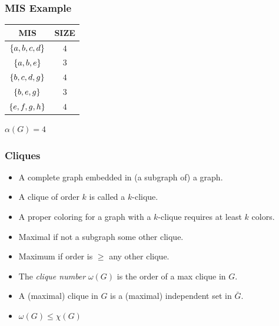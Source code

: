 \documentclass{beamer}
\renewcommand{\a}{\alpha}
\newcommand{\w}{\omega}
\newcommand{\X}{\chi}
\DeclarePairedDelimiter{\set}{\{}{\}}
\begin{document}
\begin{frame}
  \frametitle{MIS Example}
  \begin{center}
    \begin{minipage}{2in}
      \centering
    \end{minipage}
    \begin{minipage}{2in}
      \centering
      \begin{tabular}{c|c}
        MIS & SIZE \\
        \hline
        \(\set{a, b, c, d}\) & \(4\) \\
        \(\set{a, b, e}\) & \(3\) \\
        \(\set{b, c, d, g}\) & \(4\) \\
        \(\set{b, e, g}\) & \(3\) \\
        \(\set{e, f, g, h}\) & \(4\)
      \end{tabular}

      \bigskip

      \(\a(G)=4\)
    \end{minipage}
  \end{center}
\end{frame}

\begin{frame}
  \frametitle{Cliques}
  \begin{itemize}
  \item A complete graph embedded in (a subgraph of) a graph.
  \item A clique of order \(k\) is called a \(k\)-clique.
  \item A proper coloring for a graph with a \(k\)-clique requires at least \(k\) colors.
  \item Maximal if not a subgraph some other clique.
  \item Maximum if order is \(\ge\) any other clique.
  \item The \emph{clique number} \(\w(G)\) is the order of a max clique in \(G\).
  \item A (maximal) clique in \(G\) is a (maximal) independent set in \(\bar{G}\).
  \item \(\w(G)\le\X(G)\)
  \end{itemize}
\end{frame}
\end{document}
